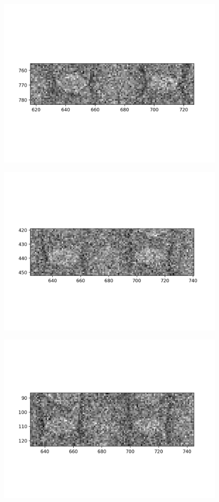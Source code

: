 \documentclass[10pt,a4paper]{article}
\begin{document}
\begin{figure}
	\includegraphics{data/image_stamps/b10}
\end{figure}
\begin{figure}
	\includegraphics{data/image_stamps/b11}
\end{figure}
\begin{figure}
	\includegraphics{data/image_stamps/b12}
\end{figure}
\end{document}
